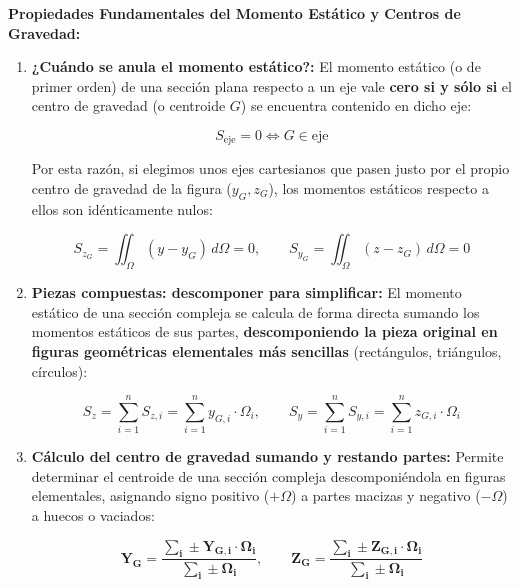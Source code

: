 \begin{ImportanteBox}

    \textbf{Propiedades Fundamentales del Momento Estático y Centros de Gravedad:}

    \begin{enumerate}

        \item \textbf{¿Cuándo se anula el momento estático?:} El momento estático (o de primer orden) de una sección plana respecto a un eje vale \textbf{cero si y sólo si} el centro de gravedad (o centroide $G$) se encuentra contenido en dicho eje:

              \begin{equation}
                  S_{\text{eje}} = 0 \iff G \in \text{eje}
\end{equation}

              Por esta razón, si elegimos unos ejes cartesianos que pasen justo por el propio centro de gravedad de la figura ($y_G, z_G$), los momentos estáticos respecto a ellos son idénticamente nulos:

              \begin{equation}
                  S_{z_G} = \iint_{\Omega} (y - y_G)\, d\Omega = 0, \qquad S_{y_G} = \iint_{\Omega} (z - z_G)\, d\Omega = 0
\end{equation}

        \item \textbf{Piezas compuestas: descomponer para simplificar:} El momento estático de una sección compleja se calcula de forma directa sumando los momentos estáticos de sus partes, \textbf{descomponiendo la pieza original en figuras geométricas elementales más sencillas} (rectángulos, triángulos, círculos):

              \begin{equation}
                  S_z = \sum_{i=1}^{n} S_{z,i} = \sum_{i=1}^{n} y_{G,i} \cdot \Omega_i, \qquad S_y = \sum_{i=1}^{n} S_{y,i} = \sum_{i=1}^{n} z_{G,i} \cdot \Omega_i
\end{equation}

        \item \textbf{Cálculo del centro de gravedad sumando y restando partes:} Permite determinar el centroide de una sección compleja descomponiéndola en figuras elementales, asignando signo positivo ($+\Omega$) a partes macizas y negativo ($-\Omega$) a huecos o vaciados:

              \begin{equation}
                  \mathbf{Y_G = \frac{\sum_{i} \pm Y_{G,i} \cdot \Omega_i}{\sum_{i} \pm \Omega_i}}, \qquad \mathbf{Z_G = \frac{\sum_{i} \pm Z_{G,i} \cdot \Omega_i}{\sum_{i} \pm \Omega_i}}
\end{equation}




\end{enumerate}
\end{ImportanteBox}
